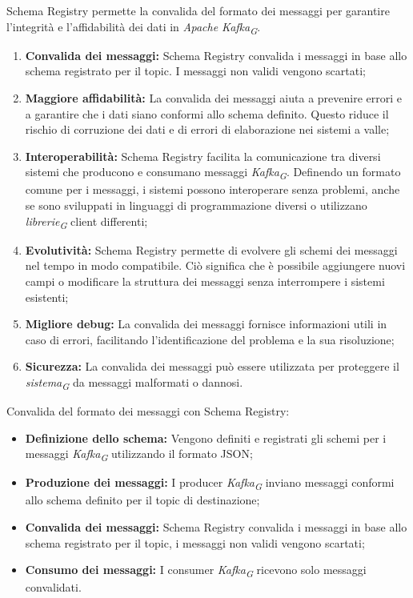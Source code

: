 Schema Registry permette la convalida del formato dei messaggi per garantire l'integrità e l'affidabilità dei dati in \textit{Apache Kafka}\textsubscript{\textit{G}}.
\begin{enumerate}
    \item \textbf{Convalida dei messaggi:} Schema Registry convalida i messaggi in base allo schema registrato per il topic. I messaggi non validi vengono scartati;
    \item \textbf{Maggiore affidabilità:} La convalida dei messaggi aiuta a prevenire errori e a garantire che i dati siano conformi allo schema definito. Questo riduce il rischio di corruzione dei dati e di errori di elaborazione nei sistemi a valle;
    \item \textbf{Interoperabilità:} Schema Registry facilita la comunicazione tra diversi sistemi che producono e consumano messaggi \textit{Kafka}\textsubscript{\textit{G}}. Definendo un formato comune per i messaggi, i sistemi possono interoperare senza problemi, anche se sono sviluppati in linguaggi di programmazione diversi o utilizzano \textit{librerie}\textsubscript{\textit{G}} client differenti;
    \item \textbf{Evolutività:} Schema Registry permette di evolvere gli schemi dei messaggi nel tempo in modo compatibile. Ciò significa che è possibile aggiungere nuovi campi o modificare la struttura dei messaggi senza interrompere i sistemi esistenti;
    \item \textbf{Migliore debug:} La convalida dei messaggi fornisce informazioni utili in caso di errori, facilitando l'identificazione del problema e la sua risoluzione;
    \item \textbf{Sicurezza:} La convalida dei messaggi può essere utilizzata per proteggere il \textit{sistema}\textsubscript{\textit{G}} da messaggi malformati o dannosi.
\end{enumerate}

Convalida del formato dei messaggi con Schema Registry:
\begin{itemize}
    \item \textbf{Definizione dello schema:} Vengono definiti e registrati gli schemi per i messaggi \textit{Kafka}\textsubscript{\textit{G}} utilizzando il formato JSON;
    \item \textbf{Produzione dei messaggi:} I producer \textit{Kafka}\textsubscript{\textit{G}} inviano messaggi conformi allo schema definito per il topic di destinazione;
    \item \textbf{Convalida dei messaggi:} Schema Registry convalida i messaggi in base allo schema registrato per il topic, i messaggi non validi vengono scartati;
    \item \textbf{Consumo dei messaggi:} I consumer \textit{Kafka}\textsubscript{\textit{G}} ricevono solo messaggi convalidati.
\end{itemize}

